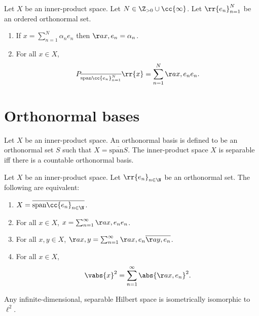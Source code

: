\documentclass{article}
\begin{document}
\begin{theorem}
  Let $X$ be an inner-product space. Let $N\in\Z_{>0}\cup\cc{\infty}$. Let $\rr{e_n}_{n=1}^N$
  be an ordered orthonormal set.
  \begin{enumerate}
    \item If $x=\sum_{n=1}^{N} \alpha_n e_n$ then $\aa{x,e_n}=\alpha_n$.
    \item For all $x\in X$, \begin{align*}
        P_{\overline{\text{span}\cc{e_n}_{n=1}^N}}\rr{x}=\sum_{n=1}^{N} \aa{x,e_n}e_n.
      \end{align*}
  \end{enumerate}
\end{theorem}

\section{Orthonormal bases}\label{sec:orthonormal-bases}

\begin{definition}\label{def:orthonormal-basis}
  Let $X$ be an inner-product space. An orthonormal basis is defined to be an orthonormal
  set $S$ such that $X=\overline{\text{span}S}$. The inner-product space $X$ is separable
  iff there is a countable orthonormal basis.
\end{definition}

\begin{theorem}
  Let $X$ be an inner-product space. Let $\rr{e_n}_{n\in\N}$ be an orthonormal set.
  The following are equivalent:
  \begin{enumerate}
    \item $X=\overline{\text{span}\cc{e_n}_{n\in\N}}$.
    \item For all $x\in X$, $x=\sum_{n=1}^{\infty} \aa{x,e_n}e_n$.
    \item For all $x,y\in X$, $\aa{x,y}=\sum_{n=1}^{\infty} \aa{x,e_n}\overline{\aa{y,e_n}}$.
    \item For all $x\in X$, \begin{align*}
        \vabs{x}^2 = \sum_{n=1}^{\infty} \abs{\aa{x,e_n}}^2.
      \end{align*}
  \end{enumerate}
\end{theorem}

\begin{corollary}
  Any infinite-dimensional, separable Hilbert space is isometrically isomorphic to $\ell^2$.
\end{corollary}
\end{document}
